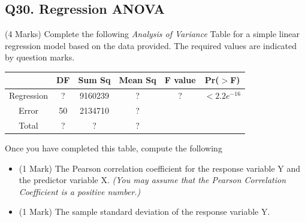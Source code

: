 \documentclass[a4paper,12pt]{article}
\begin{document}

\subsection*{Q30. Regression ANOVA}
(4 Marks) Complete the following \textit{Analysis of Variance} Table for a simple linear regression model based on the data provided. The required values are indicated by question marks.
\begin{center}
	\begin{tabular}{|c|c|c|c|c|c|} \hline
		& DF & 	Sum Sq &	Mean Sq &	F value &   	Pr($>$F)    \\ \hline
		Regression &  ? &	9160239 &	? &	 ? &	$< 2.2e^{-16}$ \\ \hline
		Error  & 50 &	2134710 &  	?   &            &       \\ \hline
		Total  & ?  &	? &  	?  &            &       \\ \hline
	\end{tabular} 
\end{center}

Once you have completed this table, compute the following
\begin{itemize}
	\item (1 Mark) The Pearson correlation coefficient for the response variable Y and the predictor variable X.\textit{ (You may assume that the Pearson Correlation Coefficient is a positive number.)}
	\item (1 Mark) The sample standard deviation of the response variable Y.
\end{itemize}
\newpage
\end{document}
